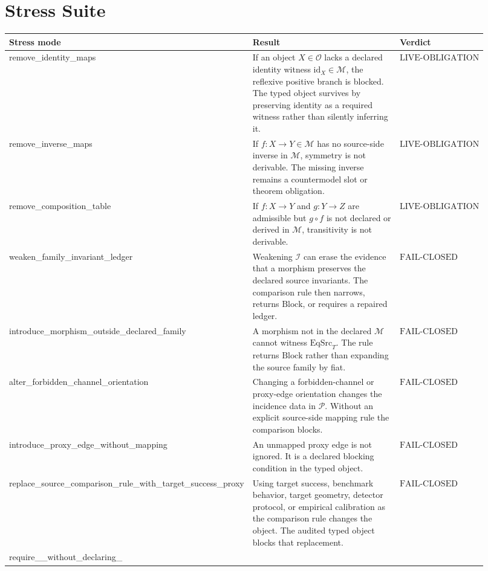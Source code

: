 \documentclass[11pt]{article}
\newcommand{\EqSrcT}{\mathrm{EqSrc}_{T}}
\newcommand{\Block}{\mathrm{Block}}
\newcommand{\RetainH}{\mathrm{RetainH}}
\newcommand{\Osrc}{\mathcal{O}}
\newcommand{\Msrc}{\mathcal{M}}
\newcommand{\Isrc}{\mathcal{I}}
\newcommand{\Psrc}{\mathcal{P}}
\newcommand{\FailClosed}{\mathrm{FAIL}\mbox{-}\mathrm{CLOSED}}
\newcommand{\LiveObligation}{\mathrm{LIVE}\mbox{-}\mathrm{OBLIGATION}}
\begin{document}
\section{Stress Suite}

\begin{longtable}{p{0.30\linewidth}p{0.48\linewidth}p{0.14\linewidth}}
\toprule
Stress mode & Result & Verdict \\
\midrule
remove\_identity\_maps &
If an object \(X\in\Osrc\) lacks a declared identity witness
\(\mathrm{id}_{X}\in\Msrc\), the reflexive positive branch is blocked. The
typed object survives by preserving identity as a required witness rather than
silently inferring it. & \(\LiveObligation\) \\
remove\_inverse\_maps &
If \(f:X\to Y\in\Msrc\) has no source-side inverse in \(\Msrc\), symmetry is
not derivable. The missing inverse remains a countermodel slot or theorem
obligation. & \(\LiveObligation\) \\
remove\_composition\_table &
If \(f:X\to Y\) and \(g:Y\to Z\) are admissible but \(g\circ f\) is not
declared or derived in \(\Msrc\), transitivity is not derivable. & \(\LiveObligation\) \\
weaken\_family\_invariant\_ledger &
Weakening \(\Isrc\) can erase the evidence that a morphism preserves the
declared source invariants. The comparison rule then narrows, returns
\(\Block\), or requires a repaired ledger. & \(\FailClosed\) \\
introduce\_morphism\_outside\_declared\_family &
A morphism not in the declared \(\Msrc\) cannot witness \(\EqSrcT\). The rule
returns \(\Block\) rather than expanding the source family by fiat. &
\(\FailClosed\) \\
alter\_forbidden\_channel\_orientation &
Changing a forbidden-channel or proxy-edge orientation changes the incidence
data in \(\Psrc\). Without an explicit source-side mapping rule the comparison
blocks. & \(\FailClosed\) \\
introduce\_proxy\_edge\_without\_mapping &
An unmapped proxy edge is not ignored. It is a declared blocking condition in
the typed object. & \(\FailClosed\) \\
replace\_source\_comparison\_rule\_with\_target\_success\_proxy &
Using target success, benchmark behavior, target geometry, detector protocol,
or empirical calibration as the comparison rule changes the object. The
audited typed object blocks that replacement. & \(\FailClosed\) \\
require\_\RetainH\_without\_declaring\_\RetainH &

\end{longtable}
\end{document}
